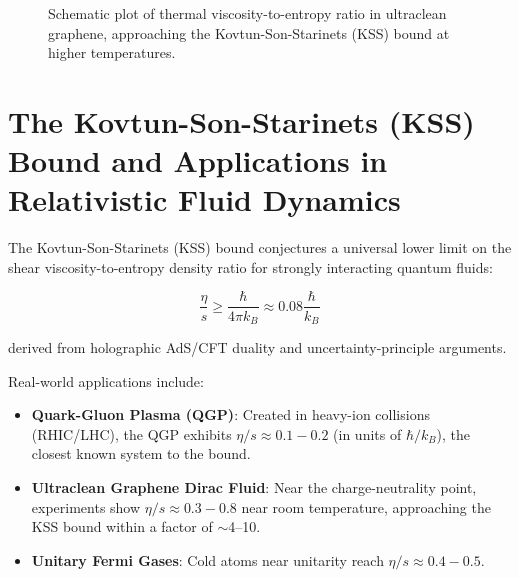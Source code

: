 \documentclass[11pt,a4paper]{article}
\begin{document}
\begin{figure}[!htbp]
\centering
{}
\caption{Schematic plot of thermal viscosity-to-entropy ratio in ultraclean graphene, approaching the Kovtun-Son-Starinets (KSS) bound at higher temperatures.}
\label{fig:viscosity}
\end{figure}

\section{The Kovtun-Son-Starinets (KSS) Bound and Applications in Relativistic Fluid Dynamics}

The Kovtun-Son-Starinets (KSS) bound\cite{kovtun2005} conjectures a universal lower limit on the shear viscosity-to-entropy density ratio for strongly interacting quantum fluids:

\[
\frac{\eta}{s} \geq \frac{\hbar}{4\pi k_B} \approx 0.08 \frac{\hbar}{k_B}
\]

derived from holographic AdS/CFT duality and uncertainty-principle arguments.

Real-world applications include:

\begin{itemize}
\item \textbf{Quark-Gluon Plasma (QGP)}: Created in heavy-ion collisions (RHIC/LHC), the QGP exhibits $\eta/s \approx 0.1 - 0.2$ (in units of $\hbar/k_B$), the closest known system to the bound\cite{heinz2013}.
\item \textbf{Ultraclean Graphene Dirac Fluid}: Near the charge-neutrality point, experiments show $\eta/s \approx 0.3 - 0.8$ near room temperature\cite{majumdar2025, bandurin2016, crossno2016}, approaching the KSS bound within a factor of $\sim$4--10.
\item \textbf{Unitary Fermi Gases}: Cold atoms near unitarity reach $\eta/s \approx 0.4 - 0.5$\cite{cao2011}.
\end{itemize}
\end{document}
